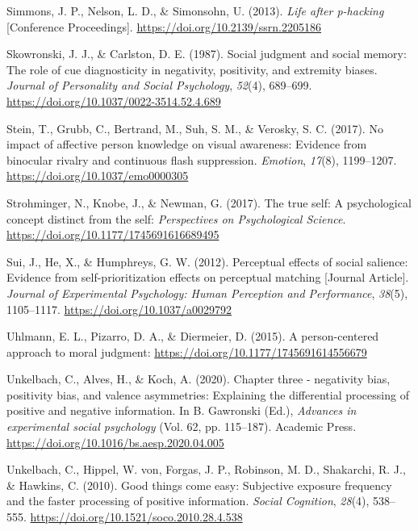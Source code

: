 \documentclass[
  man]{apa6}
\newlength{\cslhangindent}
\newlength{\cslentryspacingunit} %
\newenvironment{CSLReferences}[2] %
 {%
  \setlength{\parindent}{0pt}
  \ifodd #1
  \let\oldpar\par
  \def\par{\hangindent=\cslhangindent\oldpar}
  \fi
  \setlength{\parskip}{#2\cslentryspacingunit}
 }%
 {}
\begin{document}
\begin{CSLReferences}{1}{0}
\leavevmode{}%
Simmons, J. P., Nelson, L. D., \& Simonsohn, U. (2013). \emph{Life after p-hacking} {[}Conference Proceedings{]}. \url{https://doi.org/10.2139/ssrn.2205186}

\leavevmode{}%
Skowronski, J. J., \& Carlston, D. E. (1987). Social judgment and social memory: The role of cue diagnosticity in negativity, positivity, and extremity biases. \emph{Journal of Personality and Social Psychology}, \emph{52}(4), 689--699. \url{https://doi.org/10.1037/0022-3514.52.4.689}

\leavevmode{}%
Stein, T., Grubb, C., Bertrand, M., Suh, S. M., \& Verosky, S. C. (2017). No impact of affective person knowledge on visual awareness: Evidence from binocular rivalry and continuous flash suppression. \emph{Emotion}, \emph{17}(8), 1199--1207. \url{https://doi.org/10.1037/emo0000305}

\leavevmode{}%
Strohminger, N., Knobe, J., \& Newman, G. (2017). The true self: A psychological concept distinct from the self: \emph{Perspectives on Psychological Science}. \url{https://doi.org/10.1177/1745691616689495}

\leavevmode{}%
Sui, J., He, X., \& Humphreys, G. W. (2012). Perceptual effects of social salience: Evidence from self-prioritization effects on perceptual matching {[}Journal Article{]}. \emph{Journal of Experimental Psychology: Human Perception and Performance}, \emph{38}(5), 1105--1117. \url{https://doi.org/10.1037/a0029792}

\leavevmode{}%
Uhlmann, E. L., Pizarro, D. A., \& Diermeier, D. (2015). A person-centered approach to moral judgment: \url{https://doi.org/10.1177/1745691614556679}

\leavevmode{}%
Unkelbach, C., Alves, H., \& Koch, A. (2020). Chapter three - negativity bias, positivity bias, and valence asymmetries: Explaining the differential processing of positive and negative information. In B. Gawronski (Ed.), \emph{Advances in experimental social psychology} (Vol. 62, pp. 115--187). Academic Press. \url{https://doi.org/10.1016/bs.aesp.2020.04.005}

\leavevmode{}%
Unkelbach, C., Hippel, W. von, Forgas, J. P., Robinson, M. D., Shakarchi, R. J., \& Hawkins, C. (2010). Good things come easy: Subjective exposure frequency and the faster processing of positive information. \emph{Social Cognition}, \emph{28}(4), 538--555. \url{https://doi.org/10.1521/soco.2010.28.4.538}


\end{CSLReferences}
\end{document}

